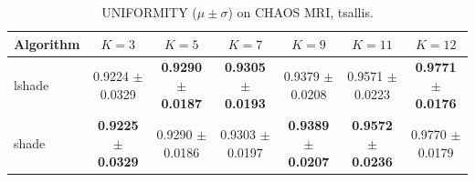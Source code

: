 \begin{table}[htbp]
\centering
\caption{UNIFORMITY ($\mu \pm \sigma$) on CHAOS MRI, tsallis.}
\label{tab:exp2-tsallis-uniformity}
\begin{tabular}{lcccccc}
\toprule
Algorithm & $K=3$ & $K=5$ & $K=7$ & $K=9$ & $K=11$ & $K=12$ \\
\midrule
lshade & 0.9224 $\pm$ 0.0329 & \textbf{0.9290 $\pm$ 0.0187} & \textbf{0.9305 $\pm$ 0.0193} & 0.9379 $\pm$ 0.0208 & 0.9571 $\pm$ 0.0223 & \textbf{0.9771 $\pm$ 0.0176} \\
shade & \textbf{0.9225 $\pm$ 0.0329} & 0.9290 $\pm$ 0.0186 & 0.9303 $\pm$ 0.0197 & \textbf{0.9389 $\pm$ 0.0207} & \textbf{0.9572 $\pm$ 0.0236} & 0.9770 $\pm$ 0.0179 \\
\bottomrule
\end{tabular}
\end{table}